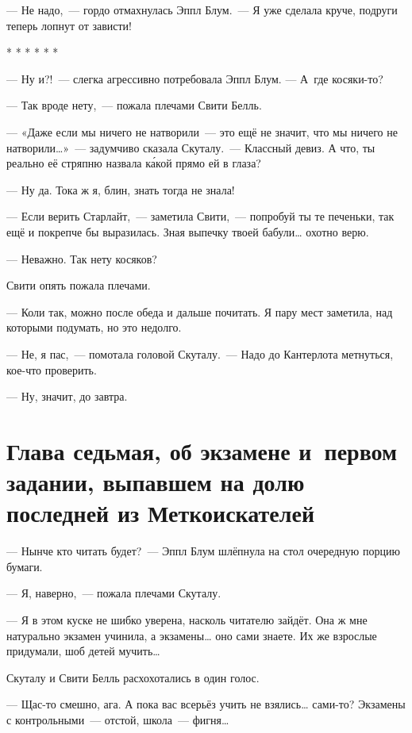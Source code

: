 \documentclass[fontsize=11pt,a5paper,titlepage=firstcover]{scrbook}
\begin{document}
--- Не надо,~--- гордо отмахнулась Эппл Блум.~--- Я уже сделала круче, подруги теперь лопнут от зависти!
\begin{center}* * * * * *\end{center}

--- Ну и?!~--- слегка агрессивно потребовала Эппл Блум. --- А~где косяки-то?

--- Так вроде нету,~--- пожала плечами Свити Белль.

--- «Даже если мы ничего не натворили~--- это ещё не значит, что мы ничего не натворили{\ldots}»~--- задумчиво сказала Скуталу.~--- Классный девиз. А что, ты реально её стряпню назвала ка́кой прямо ей в глаза?

--- Ну да. Тока ж я, блин, знать тогда не знала!

--- Если верить Старлайт,~--- заметила Свити,~--- попробуй ты те печеньки, так ещё и покрепче бы выразилась. Зная выпечку твоей бабули{\ldots} охотно верю.

--- Неважно. Так нету косяков?

Свити опять пожала плечами.

--- Коли так, можно после обеда и дальше почитать. Я пару мест заметила, над которыми подумать, но это недолго.

--- Не, я пас,~--- помотала головой Скуталу.~--- Надо до Кантерлота метнуться, кое-что проверить.

--- Ну, значит, до завтра.


\chapter*{Глава седьмая, об экзамене и~первом задании, выпавшем на долю последней из Меткоискателей}

--- Нынче кто читать будет?~--- Эппл Блум шлёпнула на стол очередную порцию бумаги.

--- Я, наверно,~--- пожала плечами Скуталу.

--- Я в этом куске не шибко уверена, насколь читателю зайдёт. Она ж мне натурально экзамен учинила, а экзамены{\ldots} оно сами знаете. Их же взрослые придумали, шоб детей мучить{\ldots}

Скуталу и Свити Белль расхохотались в один голос.

--- Щас-то смешно, ага. А пока вас всерьёз учить не взялись{\ldots} сами-то? Экзамены с контрольными~--- отстой, школа~--- фигня{\ldots}
\end{document}
